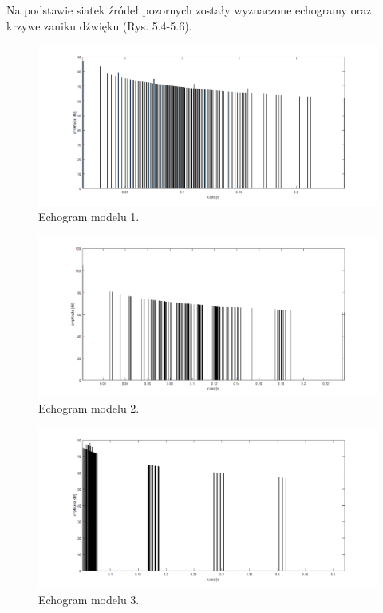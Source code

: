 Na podstawie siatek źródeł pozornych zostały wyznaczone echogramy oraz krzywe zaniku dźwięku (Rys. 5.4-5.6).

\begin{figure}[h]
        \centering
                \centering
                \includegraphics[width=12cm]{echo1}
	\caption{Echogram modelu 1.}
\end{figure}

\begin{figure}[h]
        \centering
                \centering
                \includegraphics[width=12cm]{echo2}
	\caption{Echogram modelu 2.}
\end{figure}

\begin{figure}[h]
        \centering
                \centering
                \includegraphics[width=12cm]{echo3}
	\caption{Echogram modelu 3.}
\end{figure}

